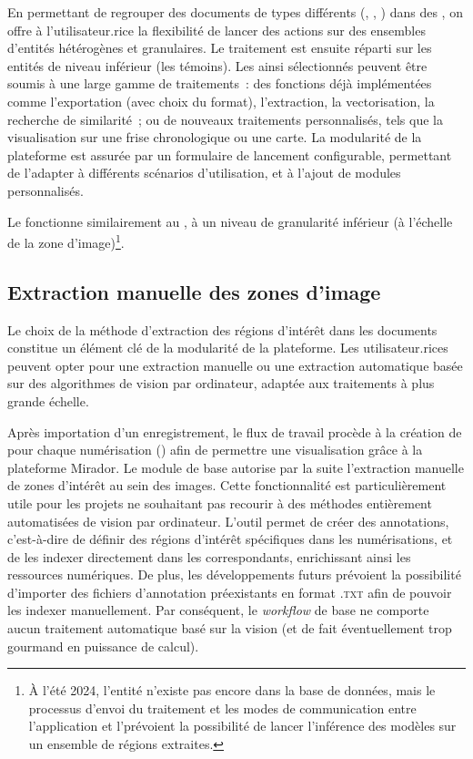 En permettant de regrouper des documents de types différents (\wos,
\sers, \wits) dans des \dss, on offre à
l'utilisateur.rice la flexibilité de lancer des actions sur des ensembles
d'entités hétérogènes et granulaires. Le traitement est ensuite réparti
sur les entités de niveau inférieur (les témoins). Les \wits ainsi
sélectionnés peuvent être soumis à une large gamme de traitements~: des
fonctions déjà implémentées comme l'exportation (avec choix du
format), l'extraction, la vectorisation, la recherche de similarité~; ou
de nouveaux traitements personnalisés, tels que la visualisation sur une
frise chronologique ou une carte. La modularité de la plateforme est
assurée par un formulaire de lancement configurable, permettant de
l'adapter à différents scénarios d'utilisation, et à l'ajout de modules
personnalisés.

Le \rs fonctionne similairement au \ds, à un niveau
de granularité inférieur (à l'échelle de la zone d'image)\footnote{À
  l'été 2024, l'entité n'existe pas encore dans la base de données, mais
  le processus d'envoi du traitement et les modes de communication entre
  l'application et l'\api prévoient la possibilité de lancer l'inférence
  des modèles sur un ensemble de régions extraites.}.

\hypertarget{extraction-des-zones-dimage-manuelle}{%
\subsection{Extraction manuelle des zones d'image}\label{extraction-des-zones-dimage-manuelle}}

Le choix de la méthode d'extraction des régions d'intérêt dans les
documents constitue un élément clé de la modularité de la plateforme.
Les utilisateur.rices peuvent opter pour une extraction manuelle ou une
extraction automatique basée sur des algorithmes de vision par
ordinateur, adaptée aux traitements à plus grande échelle.

Après importation d'un enregistrement, le flux de travail procède à la
création de \mans \iiif pour chaque numérisation
(\digit) afin de permettre une visualisation grâce à la
plateforme Mirador. Le module de base autorise par la suite
l'extraction manuelle de zones d'intérêt au sein des images. Cette
fonctionnalité est particulièrement utile pour les projets ne souhaitant
pas recourir à des méthodes entièrement automatisées de vision par
ordinateur. L'outil \sas permet de créer des annotations, c'est-à-dire de
définir des régions d'intérêt spécifiques dans les numérisations, et de
les indexer directement dans les \mans \iiif correspondants,
enrichissant ainsi les ressources numériques. De plus, les
développements futurs prévoient la possibilité d'importer des fichiers
d'annotation préexistants en format .\textsc{txt} afin de pouvoir les indexer
manuellement. Par conséquent, le \textit{workflow} de base ne comporte aucun
traitement automatique basé sur la vision (et de fait éventuellement
trop gourmand en puissance de calcul).

